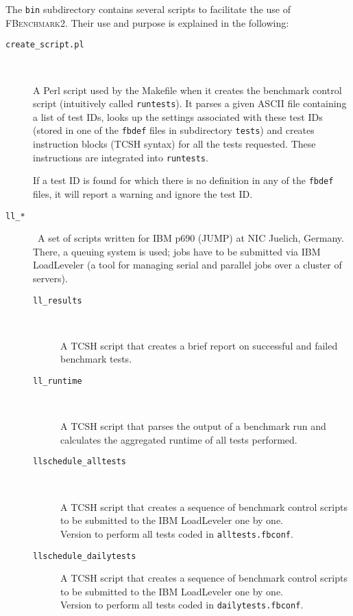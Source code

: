 The \texttt{bin} subdirectory contains several scripts to facilitate the use of
\textsc{FBenchmark2}. Their use and purpose is explained in the following:

\begin{description}
\item[\texttt{create\_script.pl}] \

A Perl script used by the Makefile when it creates the benchmark control script
(intuitively called \texttt{runtests}). It parses a given ASCII file containing
a list of test IDs, looks up the settings associated with these test IDs (stored
in one of the \texttt{fbdef} files in subdirectory \texttt{tests}) and
creates instruction blocks (TCSH syntax) for all the tests requested. These
instructions are integrated into \texttt{runtests}.

If a test ID is found for which there is no definition in any of the
\texttt{fbdef} files, it will report a warning and ignore the test ID.

\item[\texttt{ll\_*}] \
  A set of scripts written for IBM p690 (JUMP) at NIC Juelich, Germany.
  There, a queuing system is used; jobs have to be submitted via
  IBM LoadLeveler (a tool for managing serial and
  parallel jobs over a cluster of servers).

  \begin{description}
  \item[\texttt{ll\_results}] \

    A TCSH script that creates a brief report on successful and failed benchmark
    tests.

  \item[\texttt{ll\_runtime}] \

    A TCSH script that parses the output of a benchmark run and
    calculates the aggregated runtime of all tests performed.

  \item[\texttt{llschedule\_alltests}] \

    A TCSH script that creates a sequence of benchmark control scripts 
    to be submitted to the IBM LoadLeveler one by one. \\
    Version to perform all tests coded in \texttt{alltests.fbconf}.

  \item[\texttt{llschedule\_dailytests}]

    A TCSH script that creates a sequence of benchmark control scripts 
    to be submitted to the IBM LoadLeveler one by one. \\
    Version to perform all tests coded in \texttt{dailytests.fbconf}.


\end{description}
\end{description}
